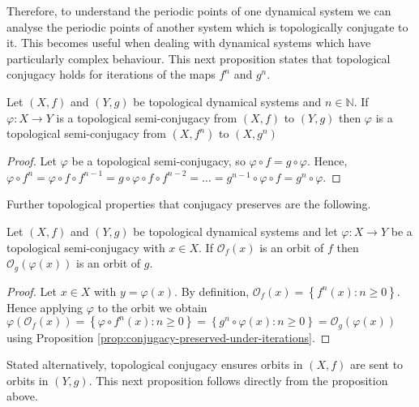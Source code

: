 Therefore, to understand the periodic points of one dynamical system we can analyse the periodic points of another system which is topologically conjugate to it. This becomes useful when dealing with dynamical systems which have particularly complex behaviour. This next proposition states that topological conjugacy holds for iterations of the maps $f^n$ and $g^n$.

\begin{prop} \label{prop:conjugacy-preserved-under-iterations}
    Let $(X, f)$ and $(Y, g)$ be topological dynamical systems and $n \in \mathbb{N}$. If $\varphi: X \to Y$ is a topological semi-conjugacy from $(X, f)$ to $(Y, g)$ then $\varphi$ is a topological semi-conjugacy from $(X, f^n)$ to $(X, g^n)$
    \begin{proof}
        Let $\varphi$ be a topological semi-conjugacy, so $\varphi \circ f = g \circ \varphi$. Hence, $\varphi \circ f^n = \varphi \circ f \circ f^{n-1} = g \circ \varphi \circ f \circ f^{n-2} = \dots = g^{n-1} \circ \varphi \circ f = g^n \circ \varphi$.
    \end{proof}
\end{prop}

Further topological properties that conjugacy preserves are the following.

\begin{prop} \label{prop:conjugacy-preserves-orbits}
    Let $(X, f)$ and $(Y, g)$ be topological dynamical systems and let $\varphi: X \to Y$ be a topological semi-conjugacy with $x \in X$. If $\mathcal{O}_f(x)$ is an orbit of $f$ then $\mathcal{O}_g(\varphi(x))$ is an orbit of $g$.
    \begin{proof}
        Let $x \in X$ with $y = \varphi(x)$. By definition, $\mathcal{O}_f(x) = \left\lbrace f^n(x) : n \geq 0 \right\rbrace$. Hence applying $\varphi$ to the orbit we obtain $\varphi\left(\mathcal{O}_f(x)\right) = \left\lbrace \varphi \circ f^n(x) : n \geq 0 \right\rbrace = \left\lbrace g^n \circ \varphi(x) : n \geq 0 \right\rbrace = \mathcal{O}_g(\varphi(x))$ using Proposition \ref{prop:conjugacy-preserved-under-iterations}.
    \end{proof}
\end{prop}

Stated alternatively, topological conjugacy ensures orbits in $(X, f)$ are sent to orbits in $(Y, g)$. This next proposition follows directly from the proposition above.

